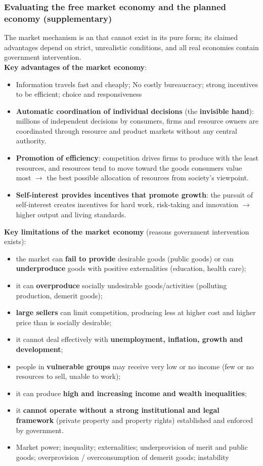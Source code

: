 \subsubsection*{Evaluating the free market economy and the planned economy (supplementary)}
The market mechanism is an  that cannot exist in its pure form; its claimed advantages depend on strict, unrealistic conditions, and all real economies contain government intervention.
\\
\textbf{Key advantages of the market economy}:
\begin{itemize}
	\item Information travels fast and cheaply; No costly bureaucracy; strong incentives to be efficient; choice and responsiveness
  \item \textbf{Automatic coordination of individual decisions} (the \textbf{invisible hand}): millions of independent decisions by consumers, firms and resource owners are coordinated through resource and product markets without any central authority.
  \item \textbf{Promotion of efficiency}: competition drives firms to produce with the least resources, and resources tend to move toward the goods consumers value most $\to$ the best possible allocation of resources from society's viewpoint.
  \item \textbf{Self-interest provides incentives that promote growth}: the pursuit of self-interest creates incentives for hard work, risk-taking and innovation $\to$ higher output and living standards.
\end{itemize}
\textbf{Key limitations of the market economy} (reasons government intervention exists):
\begin{itemize}
  \item the market can \textbf{fail to provide} desirable goods (public goods) or can \textbf{underproduce} goods with positive externalities (education, health care);
  \item it can \textbf{overproduce} socially undesirable goods/activities (polluting production, demerit goods);
  \item \textbf{large sellers} can limit competition, producing less at higher cost and higher price than is socially desirable;
  \item it cannot deal effectively with \textbf{unemployment, inflation, growth and development};
  \item people in \textbf{vulnerable groups} may receive very low or no income (few or no resources to sell, unable to work);
  \item it can produce \textbf{high and increasing income and wealth inequalities};
  \item it \textbf{cannot operate without a strong institutional and legal framework} (private property and property rights) established and enforced by government.
	\item Market power; inequality; externalities; underprovision of merit and public goods; overprovision / overconsumption of demerit goods; instability
\end{itemize}
